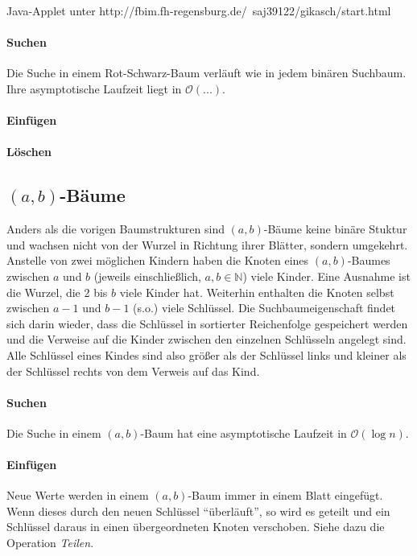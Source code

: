 Java-Applet unter http://fbim.fh-regensburg.de/~saj39122/gikasch/start.html

\paragraph{Suchen} Die Suche in einem Rot-Schwarz-Baum verläuft wie in jedem binären Suchbaum.
Ihre asymptotische Laufzeit liegt in $\mathcal{O}(...)$.
\paragraph{Einfügen}
\paragraph{Löschen}

\subsection{$(a, b)$-Bäume}
Anders als die vorigen Baumstrukturen sind $(a, b)$-Bäume keine binäre Stuktur und wachsen nicht von der Wurzel in Richtung ihrer Blätter, sondern umgekehrt.
Anstelle von zwei möglichen Kindern haben die Knoten eines $(a, b)$-Baumes zwischen $a$ und $b$ (jeweils einschließlich, $a, b \in \mathbb{N}$) viele Kinder.
Eine Ausnahme ist die Wurzel, die 2 bis $b$ viele Kinder hat.
Weiterhin enthalten die Knoten selbst zwischen $a-1$ und $b-1$ (s.o.) viele Schlüssel.
Die Suchbaumeigenschaft findet sich darin wieder,
dass die Schlüssel in sortierter Reichenfolge gespeichert werden und die Verweise auf die Kinder zwischen den einzelnen Schlüsseln angelegt sind.
Alle Schlüssel eines Kindes sind also größer als der Schlüssel links und kleiner als der Schlüssel rechts von dem Verweis auf das Kind.

\paragraph{Suchen} Die Suche in einem $(a, b)$-Baum hat eine asymptotische Laufzeit in $\mathcal{O}(\log n)$.

\paragraph{Einfügen} Neue Werte werden in einem $(a, b)$-Baum immer in einem Blatt eingefügt.
Wenn dieses durch den neuen Schlüssel "`überläuft"',
so wird es geteilt und ein Schlüssel daraus in einen übergeordneten Knoten verschoben.
Siehe dazu die Operation \textit{Teilen}.

